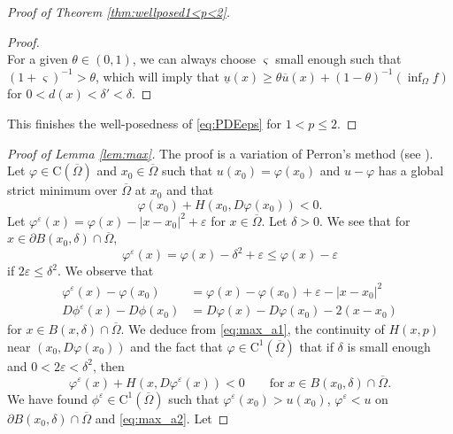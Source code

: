 \documentclass[11pt,reqno]{amsart}
\numberwithin{figure}{section}
\theoremstyle{plain}
\theoremstyle{remark}
\numberwithin{equation}{section}
\newcommand{\rmC}{\mathrm{C}}
\begin{document}
\begin{appendices}
\begin{proof} [Proof of Theorem \ref{thm:wellposed1<p<2}]
\begin{proof}
\begin{equation*}
\end{equation*}
For a given $\theta\in (0,1)$, we can always choose $\varsigma$ small enough such that $(1+\varsigma)^{-1} > \theta$, which will imply that $\underline{u}(x) \geq \theta \overline{u}(x) + (1-\theta) ^{-1}\left(\inf_\Omega f\right)$ for $0< d(x) < \delta' < \delta$.
\end{proof}
\noindent This finishes the well-posedness of \eqref{eq:PDEeps} for $1<p\leq2$. 
\end{proof}


\begin{proof}[Proof of Lemma \ref{lem:max}] The proof is a variation of Perron's method (see \cite{Capuzzo-Dolcetta1990}). Let $\varphi\in \rmC(\overline{\Omega})$ and $x_0\in \overline{\Omega}$ such that $u(x_0) = \varphi(x_0)$ and $u-\varphi$ has a global strict minimum over $\overline{\Omega}$ at $x_0$ and that 
\begin{equation}\label{eq:max_a1}
      \varphi(x_0) + H(x_0,D\varphi(x_0)) < 0.
\end{equation}
Let $\varphi^\varepsilon(x) = \varphi(x) - |x-x_0|^2 + \varepsilon$ for $x\in \overline{\Omega}$. Let $\delta > 0$. We see that for $x\in \partial B(x_0,\delta)\cap \overline{\Omega}$,
\begin{equation*}
    \varphi^\varepsilon(x) = \varphi(x) - \delta^2 +\varepsilon \leq \varphi(x) - \varepsilon
\end{equation*}
if $2\varepsilon \leq \delta^2$. We observe that
\begin{equation*}
    \begin{split}
    \varphi^\varepsilon(x) - \varphi(x_0)  &= \varphi(x)-\varphi(x_0) + \varepsilon - |x-x_0|^2 \\
    D\phi^\varepsilon(x) - D\phi(x_0) &= D\varphi(x) - D\varphi(x_0) - 2(x-x_0)
    \end{split}
\end{equation*}
for $x\in B(x,\delta)\cap \overline{\Omega}$. We deduce from \eqref{eq:max_a1}, the continuity of $H(x,p)$ near $(x_0,D\varphi(x_0))$ and the fact that $\varphi\in \rmC^1(\overline{\Omega})$ that if $\delta$ is small enough and $0<2\varepsilon < \delta^2$, then
\begin{equation}\label{eq:max_a2}
      \varphi^\varepsilon(x)+H(x,D\varphi^\varepsilon(x)) < 0 \qquad\text{for}\;x\in B(x_0,\delta)\cap \overline{\Omega}.
\end{equation}
We have found $\phi^\varepsilon\in \mathrm{C}^1(\overline{\Omega})$ such that $\varphi^\varepsilon(x_0)>u(x_0)$, $\varphi^\varepsilon<u$ on $\partial B(x_0,\delta)\cap \overline{\Omega}$ and \eqref{eq:max_a2}. Let

\end{proof}
\end{appendices}
\end{document}
